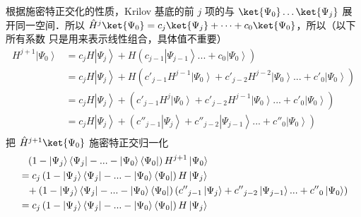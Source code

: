 根据施密特正交化的性质，Krilov 基底的前 $j$ 项的与 $\ket{\Psi_0}\dots\ket{\Psi_j}$ 展开同一空间．所以 $\hat H^j\ket{\Psi_0} = c_j\ket{\Psi_j} +\dots + c_0 \ket{\Psi_0}$，所以（以下所有系数 只是用来表示线性组合，具体值不重要）
\begin{equation}\begin{aligned}
  {H^{j + 1}}\left| {{\Psi _0}} \right\rangle  &= {c_j}H\left| {{\Psi _j}} \right\rangle  + H\left( {{c_{j - 1}}\left| {{\Psi _{j - 1}}} \right\rangle ... + {c_0}\left| {{\Psi _0}} \right\rangle } \right)  \\
   &= {c_j}H\left| {{\Psi _j}} \right\rangle  + H\left( {{{c'}_{j - 1}}{H^{j - 1}}\left| {{\Psi _0}} \right\rangle  + {{c'}_{j - 2}}{H^{j - 2}}\left| {{\Psi _0}} \right\rangle ... + {{c'}_0}\left| {{\Psi _0}} \right\rangle } \right)  \\
   &= {c_j}H\left| {{\Psi _j}} \right\rangle  + \left( {{{c'}_{j - 1}}{H^j}\left| {{\Psi _0}} \right\rangle  + {{c'}_{j - 2}}{H^{j - 1}}\left| {{\Psi _0}} \right\rangle ... + {{c'}_0}\left| {{\Psi _0}} \right\rangle } \right)  \\
   &= {c_j}H\left| {{\Psi _j}} \right\rangle  + \left( {{{c''}_{j - 1}}\left| {{\Psi _j}} \right\rangle  + {{c''}_{j - 2}}\left| {{\Psi _{j - 1}}} \right\rangle ... + {{c''}_0}\left| {{\Psi _0}} \right\rangle } \right)  \\ 
\end{aligned}\end{equation}
把 $\hat H^{j+1}\ket{\Psi_0}$ 施密特正交归一化
\begin{equation}
\begin{aligned}
&{\phantom{=}}\left( {1 - \left| {{\Psi _j}} \right\rangle \left\langle {{\Psi _j}} \right| - ... - \left| {{\Psi _0}} \right\rangle \left\langle {{\Psi _0}} \right|} \right){H^{j + 1}}\left| {{\Psi _0}} \right\rangle  \hfill \\
&= {c_j}\left( {1 - \left| {{\Psi _j}} \right\rangle \left\langle {{\Psi _j}} \right| - ... - \left| {{\Psi _0}} \right\rangle \left\langle {{\Psi _0}} \right|} \right)H\left| {{\Psi _j}} \right\rangle  \hfill \\
&{\phantom{=}}+ \left( {1 - \left| {{\Psi _j}} \right\rangle \left\langle {{\Psi _j}} \right| - ... - \left| {{\Psi _0}} \right\rangle \left\langle {{\Psi _0}} \right|} \right)\left( {{{c''}_{j - 1}}\left| {{\Psi _j}} \right\rangle  + {{c''}_{j - 2}}\left| {{\Psi _{j - 1}}} \right\rangle ... + {{c''}_0}\left| {{\Psi _0}} \right\rangle } \right) \hfill \\
&= {c_j}\left( {1 - \left| {{\Psi _j}} \right\rangle \left\langle {{\Psi _j}} \right| - ... - \left| {{\Psi _0}} \right\rangle \left\langle {{\Psi _0}} \right|} \right)H\left| {{\Psi _j}} \right\rangle  \hfill \\ 
\end{aligned}
\end{equation}

